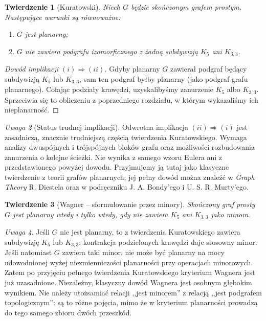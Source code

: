 \documentclass[11pt,a4paper]{report}
\numberwithin{equation}{section}
\theoremstyle{plain}
\newtheorem{twierdzenie}{Twierdzenie}[section]
\theoremstyle{definition}
\theoremstyle{remark}
\newtheorem{uwaga}[twierdzenie]{Uwaga}
\begin{document}
\begin{twierdzenie}[Kuratowski]
\label{thm:tg-kuratowski}
Niech $G$ będzie skończonym grafem prostym. Następujące
warunki są równoważne:
\begin{enumerate}[label=(\roman*)]
\item $G$ jest planarny;
\item $G$ nie zawiera podgrafu izomorficznego z żadną
subdywizją $K_5$ ani $K_{3,3}$.
\end{enumerate}
\end{twierdzenie}

\begin{proof}[Dowód implikacji \texorpdfstring{$(i)\Rightarrow(ii)$}{(i) => (ii)}]
Gdyby planarny $G$ zawierał podgraf będący subdywizją
$K_5$ lub $K_{3,3}$, sam ten podgraf byłby planarny
(jako podgraf grafu planarnego). Cofając podziały krawędzi,
uzyskalibyśmy zanurzenie $K_5$ albo $K_{3,3}$.
Sprzeciwia się to obliczeniu z poprzedniego rozdziału,
w którym wykazaliśmy ich nieplanarność.
\end{proof}

\begin{uwaga}[Status trudnej implikacji]
Odwrotna implikacja $(ii)\Rightarrow(i)$ jest zasadniczą,
znacznie trudniejszą częścią twierdzenia Kuratowskiego.
Wymaga analizy dwuspójnych i trójspójnych bloków grafu
oraz możliwości rozbudowania zanurzenia o kolejne ścieżki.
Nie wynika z samego wzoru Eulera ani z przedstawionego
powyżej dowodu. Przyjmujemy ją tutaj jako klasyczne
twierdzenie z teorii grafów planarnych; jej pełny dowód
można znaleźć w \emph{Graph Theory} R. Diestela oraz
w podręczniku J. A. Bondy'ego i U. S. R. Murty'ego.
\end{uwaga}

\begin{twierdzenie}[Wagner -- sformułowanie przez minory]
\label{thm:tg-wagner}
Skończony graf prosty $G$ jest planarny wtedy i tylko wtedy,
gdy nie zawiera $K_5$ ani $K_{3,3}$ jako minora.
\end{twierdzenie}

\begin{uwaga}
Jeśli $G$ nie jest planarny, to z twierdzenia Kuratowskiego
zawiera subdywizję $K_5$ lub $K_{3,3}$; kontrakcja
podzielonych krawędzi daje stosowny minor.
Jeśli natomiast $G$ zawiera taki minor, nie może być
planarny na mocy udowodnionej wyżej niezmienniczości
planarności przy operacjach minorowych.
Zatem po przyjęciu pełnego twierdzenia Kuratowskiego
kryterium Wagnera jest już uzasadnione. Niezależny,
klasyczny dowód Wagnera jest osobnym głębokim wynikiem. Nie należy utożsamiać relacji
,,jest minorem'' z relacją ,,jest podgrafem topologicznym'':
są to różne pojęcia, mimo że w kryterium planarności
prowadzą do tego samego zbioru dwóch przeszkód.
\end{uwaga}
\end{document}
